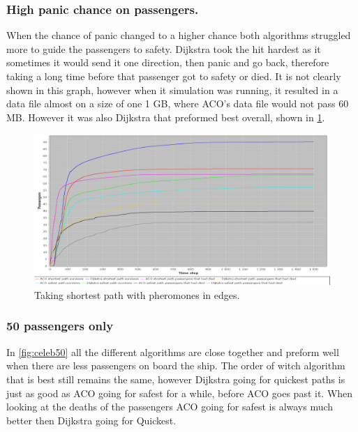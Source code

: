 \subsubsection{High panic chance on passengers.}
When the chance of panic changed to a higher chance both algorithms struggled more to guide the passengers to safety. Dijkstra took the hit hardest as it sometimes it would send it one direction, then panic and go back, therefore taking a long time before that passenger got to safety or died. It is not clearly shown in this graph, however when it simulation was running, it resulted in a data file almost on a size of one 1 GB, where ACO's data file would not pass 60 MB. However it was also Dijkstra that preformed best overall, shown in \ref{fig:celebHPanic}.

\begin{figure} [h]
\centering
\hspace*{-1.0in}
\includegraphics[scale=0.35]{images/Graph-using-200-rounds-140-passangers-and-one-fire-high-panic.png}
\caption{Taking shortest path with pheromones in edges.}
\label{fig:celebHPanic}
\end{figure}


\subsubsection{50 passengers only}

In \ref{fig:celeb50} all the different algorithms are close together and preform well when there are less passengers on board the ship. The order of witch algorithm that is best still remains the same, however Dijkstra going for quickest paths is just as good as ACO going for safest for a while, before ACO goes past it. When looking at the deaths of the passengers ACO going for safest is always much better then Dijkstra going for Quickest.

